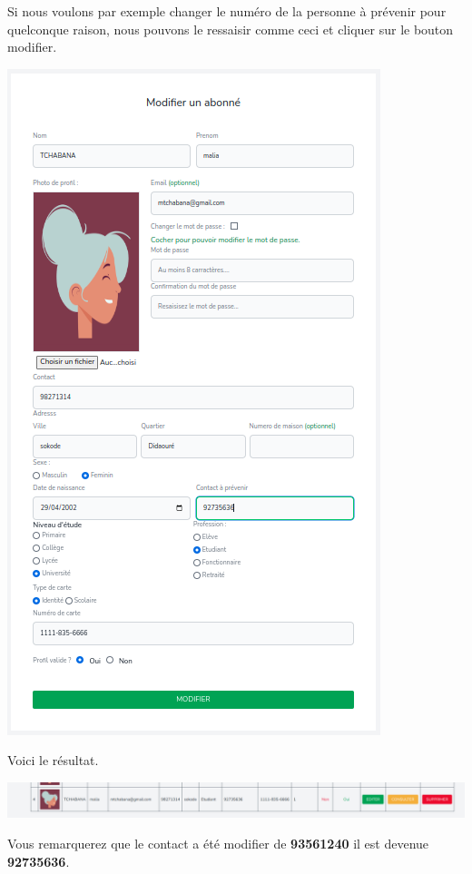 \documentclass[12pt,a4paper]{article}
\begin{document}
\begin{itemize}
\begin{center}
\end{center}
Si nous voulons par exemple changer le numéro de la personne à prévenir pour quelconque 
raison, nous pouvons le ressaisir comme ceci et cliquer sur le bouton modifier.
\begin{center}
\includegraphics[scale=0.8]{img/abonne_edit_2.png}
\end{center}
Voici le résultat.\\
\begin{center}
\includegraphics[scale=0.3]{img/abonne_edit_confirm.png}
\end{center}
Vous remarquerez que le contact a été modifier de \textbf{93561240} il est devenue \textbf{92735636}.


\end{itemize}
\end{document}

